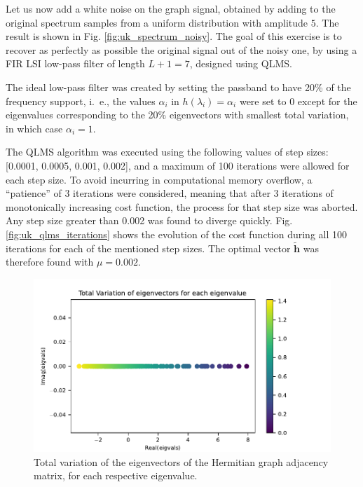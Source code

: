 Let us now add a white noise on the graph signal, obtained by adding to the original spectrum samples from a uniform distribution with amplitude $5$. The result is shown in Fig. \ref{fig:uk_spectrum_noisy}. The goal of this exercise is to recover as perfectly as possible the original signal out of the noisy one, by using a FIR LSI low-pass filter of length $L+1 = 7$, designed using QLMS.

The ideal low-pass filter was created by setting the passband to have 20\% of the frequency support, i.~e., the values $\alpha_i$ in $h(\lambda_i) = \alpha_i$ were set to 0 except for the eigenvalues corresponding to the 20\% eigenvectors with smallest total variation, in which case $\alpha_i = 1$.

The QLMS algorithm was executed using the following values of step sizes: [0.0001, 0.0005, 0.001, 0.002], and a maximum of 100 iterations were allowed for each step size. To avoid incurring in computational memory overflow, a ``patience'' of 3 iterations were considered, meaning that after 3 iterations of monotonically increasing cost function, the process for that step size was aborted. Any step size greater than 0.002 was found to diverge quickly. Fig. \ref{fig:uk_qlms_iterations} shows the evolution of the cost function during all 100 iterations for each of the mentioned step sizes. The optimal vector $\mathbf{\widetilde{h}}$ was therefore found with $\mu = 0.002$.

\begin{figure}
\centering
\includegraphics[width=0.65\linewidth]{thesis/Figures/uk_example/uk_total_variation_hermitian.pdf}
\caption{Total variation of the eigenvectors of the Hermitian graph adjacency matrix, for each respective eigenvalue.}
\label{fig:uk_total_variation_hermitian}
\end{figure}

